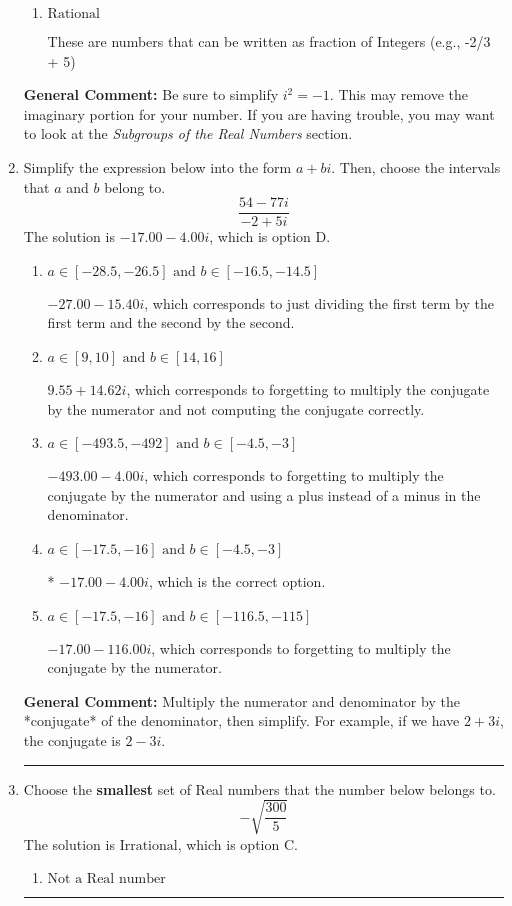 \documentclass{extbook}[14pt]
\newcommand{\litem}[1]{\item #1

\rule{\textwidth}{0.4pt}}
\begin{document}
\begin{enumerate}
{\begin{enumerate}[label=\Alph*.]
This is a Complex number $(a+bi)$ that is not Real (has $i$ as part of the number).
\item \( \text{Rational} \)

These are numbers that can be written as fraction of Integers (e.g., -2/3 + 5)
\end{enumerate}

\textbf{General Comment:} Be sure to simplify $i^2 = -1$. This may remove the imaginary portion for your number. If you are having trouble, you may want to look at the \textit{Subgroups of the Real Numbers} section.
}
\litem{
Simplify the expression below into the form $a+bi$. Then, choose the intervals that $a$ and $b$ belong to.
\[ \frac{54 - 77 i}{-2 + 5 i} \]
The solution is \( -17.00  - 4.00 i \), which is option D.\begin{enumerate}[label=\Alph*.]
\item \( a \in [-28.5, -26.5] \text{ and } b \in [-16.5, -14.5] \)

 $-27.00  - 15.40 i$, which corresponds to just dividing the first term by the first term and the second by the second.
\item \( a \in [9, 10] \text{ and } b \in [14, 16] \)

 $9.55  + 14.62 i$, which corresponds to forgetting to multiply the conjugate by the numerator and not computing the conjugate correctly.
\item \( a \in [-493.5, -492] \text{ and } b \in [-4.5, -3] \)

 $-493.00  - 4.00 i$, which corresponds to forgetting to multiply the conjugate by the numerator and using a plus instead of a minus in the denominator.
\item \( a \in [-17.5, -16] \text{ and } b \in [-4.5, -3] \)

* $-17.00  - 4.00 i$, which is the correct option.
\item \( a \in [-17.5, -16] \text{ and } b \in [-116.5, -115] \)

 $-17.00  - 116.00 i$, which corresponds to forgetting to multiply the conjugate by the numerator.
\end{enumerate}

\textbf{General Comment:} Multiply the numerator and denominator by the *conjugate* of the denominator, then simplify. For example, if we have $2+3i$, the conjugate is $2-3i$.
}
\litem{
Choose the \textbf{smallest} set of Real numbers that the number below belongs to.
\[ -\sqrt{\frac{300}{5}} \]
The solution is \( \text{Irrational} \), which is option C.\begin{enumerate}[label=\Alph*.]
\item \( \text{Not a Real number} \)


\end{enumerate}}
\end{enumerate}
\end{document}
